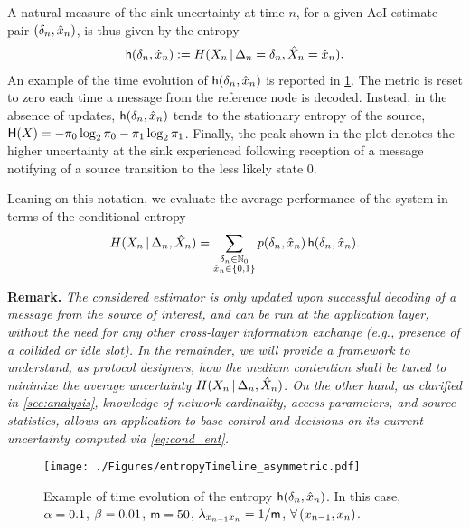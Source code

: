 A natural measure of the sink uncertainty at time $n$, for a given AoI-estimate pair $(\delta_n,\hat{x}_n)$, is thus given by the entropy
\begin{align}
    \mathsf h(\delta_n,\hat{x}_n) := H( X_n \,|\, \Delta_n = \delta_n, \hat{X}_n = \hat{x}_n).
    \label{eq:cond_ent}
\end{align}
An example of the time evolution of $\mathsf h(\delta_n,\hat{x}_n)$ is reported in \figr\ref{fig:timeline}. %
The metric is reset to zero each time a message from the reference node is decoded. Instead, in the absence of updates, $\mathsf h(\delta_n,\hat{x}_n)$ tends to the stationary entropy of the source, $\mathsf H(X) = -\pi_0 \log_2 \pi_0 -\pi_1 \log_2 \pi_1$. Finally, the peak shown in the plot denotes the higher uncertainty at the sink  experienced following reception of a message notifying of a source transition to the less likely state $0$. 

Leaning on this notation, we evaluate the average performance of the system in terms of the conditional entropy
\begin{align}
    H(X_n\,|\, \Delta_n,\hat{X}_n) = \sum_{\substack{\delta_n \in \mathbb N_0 \\ \hat{x}_n \in \{0,1\} } } p(\delta_n,\hat{x}_n)\, \mathsf h(\delta_n,\hat{x}_n).
    \label{eq:ent_def}
\end{align}

\vspace{.5em}
\textbf{Remark.} \emph{The considered estimator is only updated upon successful decoding of a message from the source of interest, and can be run at the application layer, without the need for any other cross-layer information exchange (e.g., presence of a collided or idle slot). %
    In the remainder, we will provide a framework to understand, as protocol designers, how the medium contention shall be tuned  to minimize the average uncertainty $H(X_n\, | \, \Delta_n,\hat{X}_n)$. On the other hand, as clarified in \secr\ref{sec:analysis}, knowledge of network cardinality, access parameters, and source statistics, allows an application to base control and decisions on its current uncertainty computed via \eqref{eq:cond_ent}.}

    \begin{figure}
        \centering
        \texttt{[image: ./Figures/entropyTimeline\_asymmetric.pdf]}
        \caption{Example of time evolution of the entropy $\mathsf h(\delta_n,\hat{x}_n)$. In this case, $\alpha=0.1$, $\beta=0.01$, $\mathsf m=50$, $\lambda_{x_{n-1}x_n} = 1/\mathsf m$, $\forall \, (x_{n-1},x_n)$.}
        \vspace{-1em}
        \label{fig:timeline}
    \end{figure}